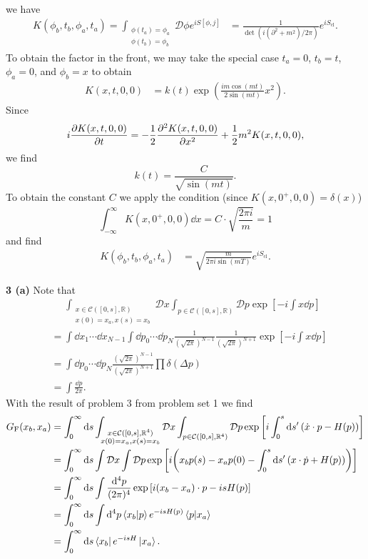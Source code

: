\documentclass{article}
\makeatletter
\newcommand*{\shifttext}[1]{%
  \settowidth{\@tempdima}{#1}%
  \hspace{-\@tempdima}#1%
}
\newcommand{\plabel}[1]{%
\shifttext{\textbf{#1}\quad}%
}
\newcommand{\prule}{%
\begin{center}%
\hdashrule[0.5ex]{.99\linewidth}{1pt}{1pt 2.5pt}%
\end{center}%
}
\makeatother
\begin{document}
we have
\begin{align*}
    K(\phi_b,t_b,\phi_a,t_a)  = \int_{\substack{\phi(t_a)=\phi_a\\ \phi(t_b) = \phi_b}} \mathcal{D}\phi e^{iS[\phi,j]}
    &= \frac{1}{\det(i(\partial^2 + m^2)/2\pi)} e^{iS_{\mathrm{cl}}}.
\end{align*}
To obtain the factor in the front, we may take the special case $t_a = 0$, $t_b = t$, $\phi_a = 0$, and $\phi_b = x$ to obtain
\begin{align*}
    K(x,t,0,0) &= k(t) \exp(\frac{i m \cos(m t)}{2 \sin(m t)} x^2).
\end{align*}
Since
\[ i\pdv{K(x,t,0,0)}{t} = -\frac{1}{2}\pdv[2]{K(x,t,0,0)}{x} + \frac{1}{2}m^2 K(x,t,0,0), \]
we find
\[ k(t) = \frac{C}{\sqrt{\sin (mt)}}. \]
To obtain the constant $C$ we apply the condition (since $K(x,0^+,0,0) = \delta(x)$)
\[ \int_{-\infty}^\infty K(x,0^+,0,0) \dd{x} = C \cdot \sqrt{\frac{2\pi i}{m}} = 1 \]
and find
\begin{align*}
    K(\phi_b,t_b,\phi_a,t_a) &= \sqrt{\frac{m}{2\pi i \sin(mT)}} e^{iS_{\mathrm{cl}}}.
\end{align*}

\prule

\plabel{3 (a)}%
Note that
\begin{align*}
    &\phantom{{}={}} \int_{\substack{x\in \mathcal{C}([0,s],\mathbb{R})\\ x(0)=x_a, x(s)=x_b}} \mathcal{D}x \int_{p\in\mathcal{C}([0,s],\mathbb{R})} \mathcal{D}p \exp[-i\int x \dd{p}] \\
    &= \int \dd{x_1} \cdots \dd{x_{N-1}} \int \dd{p_0} \cdots \dd{p_N} \frac{1}{(\sqrt{2\pi})^{N-1}} \frac{1}{(\sqrt{2\pi})^{N+1}} \exp[-i\int x \dd{p}] \\
    &= \int \dd{p_0} \cdots \dd{p_N} \frac{(\sqrt{2\pi})^{N-1}}{(\sqrt{2\pi})^{N+1}} \prod \delta(\Delta p) \\
    &= \int \frac{\dd{p}}{2\pi}.
\end{align*}
With the result of problem 3 from problem set 1 we find
\begin{align*}
    G_{\mathrm{F}}(x_b,x_a) &= \int_0^\infty \dd{s} \int_{\substack{x\in \mathcal{C}([0,s],\mathbb{R}^4)\\ x(0)=x_a, x(s)=x_b}} \mathcal{D}x \int_{p\in\mathcal{C}([0,s],\mathbb{R}^4)} \mathcal{D}p \exp\qty[i\int_0^s \dd{s'} \qty(\dot{x}\cdot p - H(p))] \\
    &= \int_0^\infty \dd{s} \int \mathcal{D}x \int \mathcal{D}p \exp\qty[i \qty(x_b p(s) - x_a p(0) - \int_0^s\dd{s'} \qty(x\cdot \dot{p} + H(p)))] \\
    &= \int_0^\infty \dd{s} \int \frac{\dd[4]{p}}{(2\pi)^4} \exp\qty[i(x_b - x_a)\cdot p - i s H(p)] \\
    &= \int_0^\infty \dd{s} \int \dd[4]{p} \bra{x_b}\ket{p}e^{-isH(p)}\bra{p}\ket{x_a} \\
    &= \int_0^\infty \dd{s} \bra{x_b} e^{-isH} \ket{x_a}.
\end{align*}
\end{document}
